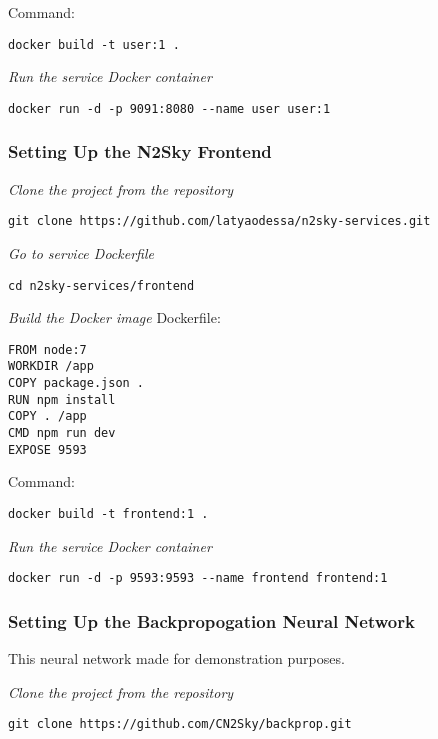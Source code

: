 Command: 

 \begin{lstlisting}
docker build -t user:1 .
\end{lstlisting}


\emph{Run the service Docker container}
 \begin{lstlisting}
docker run -d -p 9091:8080 --name user user:1
\end{lstlisting}



\subsubsection{Setting Up the N2Sky Frontend}\label{frontend setup}

\emph{Clone the project from the repository}
 \begin{lstlisting}
git clone https://github.com/latyaodessa/n2sky-services.git 
\end{lstlisting}

\emph{Go to service Dockerfile}
 \begin{lstlisting}
cd n2sky-services/frontend
\end{lstlisting}

\emph{Build the Docker image}
Dockerfile:
 \begin{lstlisting}
FROM node:7
WORKDIR /app
COPY package.json .
RUN npm install
COPY . /app
CMD npm run dev
EXPOSE 9593
\end{lstlisting}

Command:
 \begin{lstlisting}
docker build -t frontend:1 .
\end{lstlisting}


\emph{Run the service Docker container}
 \begin{lstlisting}
docker run -d -p 9593:9593 --name frontend frontend:1
\end{lstlisting}





\subsubsection{Setting Up the Backpropogation Neural Network}\label{backprop setup}

This neural network made for demonstration purposes. 

\emph{Clone the project from the repository}
 \begin{lstlisting}
git clone https://github.com/CN2Sky/backprop.git
\end{lstlisting}

